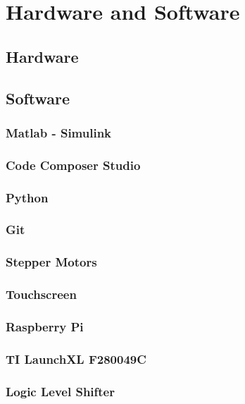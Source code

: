 \chapter{Hardware and Software}
\label{hardwareandsoftware}

\section{Hardware}

\section{Software}
\subsection{Matlab - Simulink}
\subsection{Code Composer Studio}
\subsection{Python}
\subsection{Git}
\subsection{Stepper Motors}
\subsection{Touchscreen}
\subsection{Raspberry Pi}
\subsection{TI LaunchXL F280049C}
\subsection{Logic Level Shifter}
